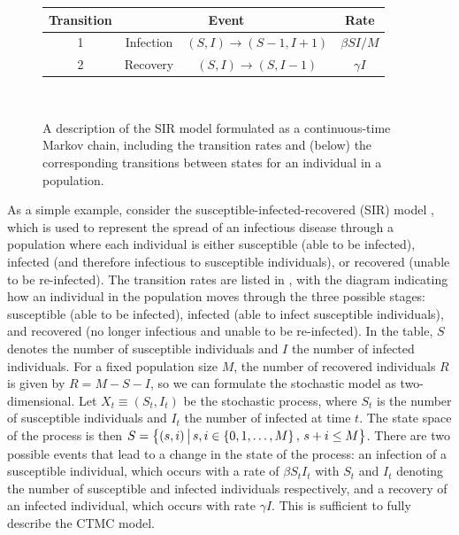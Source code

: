 \usetikzlibrary{automata,positioning,arrows}
\tikzset{->, node distance = 2cm}
\begin{figure}
	\begin{center}
		\begin{tabular}{|c|c|c|c|}
			\hline
			Transition & \multicolumn{2}{c|}{Event} & Rate                                                                  \\ \hline
			1          & Infection                  & \(\left(S, I\right) \to \left(S-1, I + 1\right)\) & \(\beta S I / M\) \\ \hline
			2          & Recovery                   & \(\left(S,I\right) \to \left(S, I - 1\right)\)    & \(\gamma I\)      \\ \hline
		\end{tabular} \\
		\vspace{2mm}
		\caption{A description of the SIR model formulated as a continuous-time Markov chain, including the transition rates and (below) the corresponding transitions between states for an individual in a population.}
		\label{fig:sir_transition}
	\end{center}
\end{figure}

As a simple example, consider the susceptible-infected-recovered (SIR) model \citep{Allen_2017_PrimerStochasticEpidemic}, which is used to represent the spread of an infectious disease through a population where each individual is either susceptible (able to be infected), infected (and therefore infectious to susceptible individuals), or recovered (unable to be re-infected).
The transition rates are listed in , with the diagram indicating how an individual in the population moves through the three possible stages: susceptible (able to be infected), infected (able to infect susceptible individuals), and recovered (no longer infectious and unable to be re-infected).
In the table, \(S\) denotes the number of susceptible individuals and \(I\) the number of infected individuals.
For a fixed population size \(M\), the number of recovered individuals \(R\) is given by \(R = M - S - I\), so we can formulate the stochastic model as two-dimensional.
Let \(X_t \equiv \left(S_t,I_t\right)\) be the stochastic process, where \(S_t\) is the number of susceptible individuals and \(I_t\) the number of infected at time \(t\).
The state space of the process is then \(S=\left\{(s,i)\,\middle|\,s,i\in\set{0,1,\dotsc,M}, \, s + i \leq M\right\}\).
There are two possible events that lead to a change in the state of the process: an infection of a susceptible individual, which occurs with a rate of \(\beta S_t I_t\) with \(S_t\) and \(I_t\) denoting the number of susceptible and infected individuals respectively, and a recovery of an infected individual, which occurs with rate \(\gamma I\).
This is sufficient to fully describe the CTMC model.

